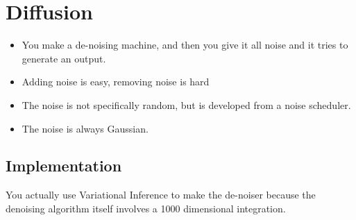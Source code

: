 \documentclass[fleqn]{report}
\begin{document}
\chapter{Diffusion}

\begin{itemize}
    \item
    You make a de-noising machine, and then you give it all noise and it 
    tries to generate an output. 
    \item
    Adding noise is easy, removing noise is hard 
    \item
    The noise is not specifically random, but is developed from a noise scheduler. 
    \item 
    The noise is always Gaussian. 
\end{itemize}

\section{Implementation}
You actually use Variational Inference to make the de-noiser because the 
denoising algorithm itself involves a 1000 dimensional integration. 
\end{document}
